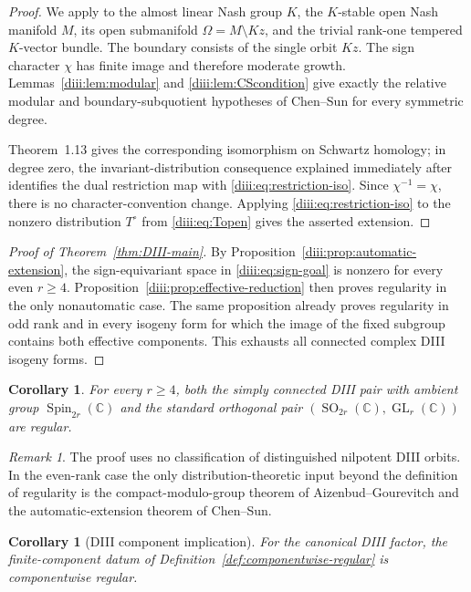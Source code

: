 \documentclass[11pt,reqno]{amsart}
\numberwithin{equation}{section}
\newtheorem{corollary}[theorem]{Corollary}
\theoremstyle{definition}
\theoremstyle{remark}
\newtheorem{remark}[theorem]{Remark}
\newcommand{\C}{\mathbb C}
\newcommand{\Spin}{\operatorname{Spin}}
\newcommand{\SO}{\operatorname{SO}}
\newcommand{\GL}{\operatorname{GL}}
\begin{document}
\begin{proof}
We apply \cite[Theorem~1.13]{ChenSun} to the almost linear Nash group $K$, the $K$-stable open Nash manifold $M$, its open submanifold
$\Omega=M\setminus Kz$, and the trivial rank-one tempered $K$-vector bundle.
The boundary consists of the single orbit $Kz$.  The sign character $\chi$ has finite image and therefore moderate growth.  Lemmas~\ref{diii:lem:modular} and
\ref{diii:lem:CScondition} give exactly the relative modular and boundary-subquotient hypotheses of Chen--Sun for every symmetric degree.

Theorem~1.13 gives the corresponding isomorphism on Schwartz homology; in degree zero, the invariant-distribution consequence explained immediately after
\cite[Theorem~1.12]{ChenSun} identifies the dual restriction map with
\eqref{diii:eq:restriction-iso}.  Since $\chi^{-1}=\chi$, there is no character-convention change.  Applying \eqref{diii:eq:restriction-iso} to the nonzero distribution
$T^\circ$ from \eqref{diii:eq:Topen} gives the asserted extension.
\end{proof}

\begin{proof}[Proof of Theorem~\ref{thm:DIII-main}]
By Proposition~\ref{diii:prop:automatic-extension}, the sign-equivariant space in
\eqref{diii:eq:sign-goal} is nonzero for every even $r\ge4$.  Proposition~\ref{diii:prop:effective-reduction} then proves regularity in the only nonautomatic case.  The same proposition already proves regularity in odd rank and in every isogeny form for which the image of the fixed subgroup contains both effective components.  This exhausts all connected complex DIII isogeny forms.
\end{proof}

\begin{corollary}\label{diii:cor:standard-forms}
For every $r\ge4$, both the simply connected DIII pair with ambient group
$\Spin_{2r}(\C)$ and the standard orthogonal pair
$(\SO_{2r}(\C),\GL_r(\C))$ are regular.
\end{corollary}

\begin{remark}
The proof uses no classification of distinguished nilpotent DIII orbits.  In the even-rank case the only distribution-theoretic input beyond the definition of regularity is the compact-modulo-group theorem of Aizenbud--Gourevitch and the automatic-extension theorem of Chen--Sun.
\end{remark}


\begin{corollary}[DIII component implication]\label{cor:DIII-component}
For the canonical DIII factor, the finite-component datum of
Definition~\ref{def:componentwise-regular} is componentwise regular.
\end{corollary}
\end{document}
